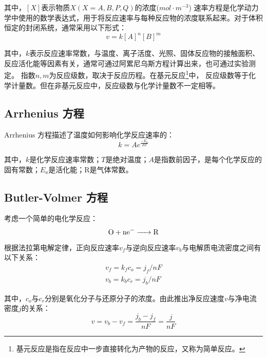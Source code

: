 其中，$[X]$表示物质$X (X=A,B,P,Q)$的浓度($mol\cdot{m^{-3}}$)
速率方程是化学动力学中使用的数学表达式，用于将反应速率与每种反应物的浓度联系起来。对于体积恒定的封闭系统，通常采用以下形式：
\begin{equation}
    v=k[A]^n[B]^m
    \label{rate_equation}
\end{equation}

其中，$k$表示反应速率常数，与温度、离子活度、光照、固体反应物的接触面积、反应活化能等因素有关，通常可通过阿累尼乌斯方程计算出来，也可通过实验测定。
指数$n,m$为反应级数，取决于反应历程。在基元反应\footnote{基元反应是指在反应中一步直接转化为产物的反应，又称为简单反应。}中，
反应级数等于化学计量数。但在非基元反应中，反应级数与化学计量数不一定相等\cite{Witelski2015}。
\subsection{Arrhenius 方程}
Arrhenius 方程描述了温度如何影响化学反应速率的：
\begin{equation}
    k=Ae^{\frac{-E_a}{RT}}
    \label{equation:Arrhenius}
\end{equation}

其中，$k$是化学反应速率常数；$T$是绝对温度；$A$是指数前因子，是每个化学反应的固有常数；$E_a$是活化能；R是气体常数\cite{ref1}。


\subsection{Butler-Volmer 方程}
考虑一个简单的电化学反应：
\begin{equation}
    \ce{O + ne- -> R}
\end{equation}

根据法拉第电解定律，正向反应速率$v_f$与逆向反应速率$v_b$与电解质电流密度之间有以下关系：
\begin{equation}
    \begin{aligned}
        v_f=k_fc_o=j_f/nF\\
        v_b=k_bc_r=j_b/nF          %
    \end{aligned}
\end{equation}

其中，$c_o$与$c_r$分别是氧化分子与还原分子的浓度。由此推出净反应速度$v$与净电流密度$j$的关系：
\begin{equation}
    v=v_b-v_f=\frac{j_b-j_f}{nF}=\frac{j}{nF}
\end{equation}


